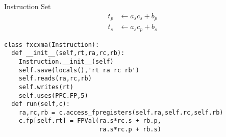 \begin{frame}[fragile,shrink=5]{Instruction Set}
\begin{align*}
  t_p &\gets a_s c_s + b_p \\
  t_s &\gets a_s c_p + b_s
\end{align*}
\begin{verbatim}
class fxcxma(Instruction):
  def __init__(self,rt,ra,rc,rb):
    Instruction.__init__(self)
    self.save(locals(),'rt ra rc rb')
    self.reads(ra,rc,rb)
    self.writes(rt)
    self.uses(PPC.FP,5)
  def run(self,c):
    ra,rc,rb = c.access_fpregisters(self.ra,self.rc,self.rb)
    c.fp[self.rt] = FPVal(ra.s*rc.s + rb.p,
                          ra.s*rc.p + rb.s)
\end{verbatim}
\end{frame}


